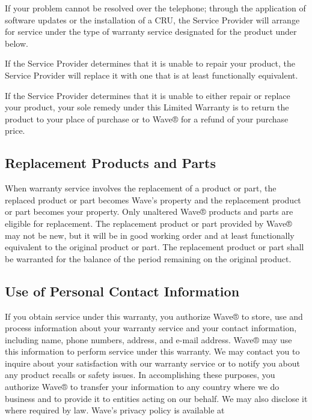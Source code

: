 \documentclass[letterpaper,10pt,english]{sphinxmanual}
\begin{document}
If your problem cannot be resolved over the telephone; through the application of software updates or the installation of a CRU, the Service Provider will arrange for service under the type of warranty service designated for the product under  below.

If the Service Provider determines that it is unable to repair your product, the Service Provider will replace it with one that is at least functionally equivalent.

If the Service Provider determines that it is unable to either repair or replace your product, your sole remedy under this Limited Warranty is to return the product to your place of purchase or to Wave® for a refund of your purchase price.


\subsection{Replacement Products and Parts}
\label{\detokenize{part1:replacement-products-and-parts}}
When warranty service involves the replacement of a product or part, the replaced product or part becomes Wave’s property and the replacement product or part becomes your property. Only unaltered Wave® products and parts are eligible for replacement. The replacement product or part provided by Wave® may not be new, but it will be in good working order and at least functionally equivalent to the original product or part. The replacement product or part shall be warranted for the balance of the period remaining on the original product.


\subsection{Use of Personal Contact Information}
\label{\detokenize{part1:use-of-personal-contact-information}}
If you obtain service under this warranty, you authorize Wave® to store, use and process information about your warranty service and your contact information, including name, phone numbers, address, and e-mail address. Wave® may use this information to perform service under this warranty. We may contact you to inquire about your satisfaction with our warranty service or to notify you about any product recalls or safety issues. In accomplishing these purposes, you authorize Wave® to transfer your information to any country where we do business and to provide it to entities acting on our behalf. We may also disclose it where required by law. Wave’s privacy policy is available at 
\end{document}
